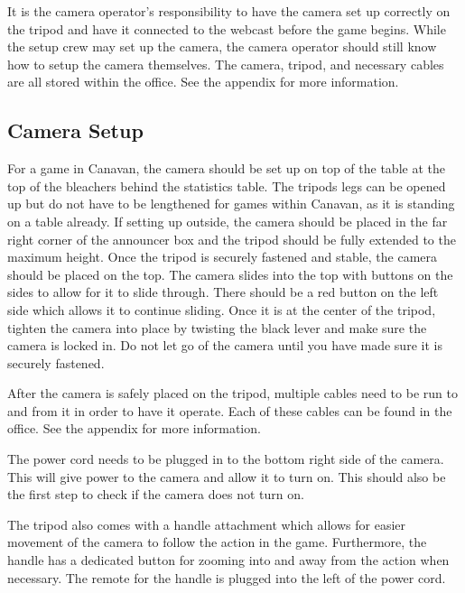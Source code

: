 \documentclass{article}
\begin{document}
It is the camera operator’s responsibility to have the camera set up correctly on the tripod and have it connected to the webcast before the game begins. While the setup crew may set up the camera, the camera operator should still know how to setup the camera themselves. The camera, tripod, and necessary cables are all stored within the office. See the appendix for more information. 


\subsection{Camera Setup}
For a game in Canavan, the camera should be set up on top of the table at the top of the bleachers behind the statistics table. The tripods legs can be opened up but do not have to be lengthened for games within Canavan, as it is standing on a table already. If setting up outside, the camera should be placed in the far right corner of the announcer box and the tripod should be fully extended to the maximum height. Once the tripod is securely fastened and stable, the camera should be placed on the top. The camera slides into the top with buttons on the sides to allow for it to slide through. There should be a red button on the left side which allows it to continue sliding. Once it is at the center of the tripod, tighten the camera into place by twisting the black lever and make sure the camera is locked in. Do not let go of the camera until you have made sure it is securely fastened. 


After the camera is safely placed on the tripod, multiple cables need to be run to and from it in order to have it operate. Each of these cables can be found in the office. See the appendix for more information.


The power cord needs to be plugged in to the bottom right side of the camera. This will give power to the camera and allow it to turn on. This should also be the first step to check if the camera does not turn on. 


The tripod also comes with a handle attachment which allows for easier movement of the camera to follow the action in the game. Furthermore, the handle has a dedicated button for zooming into and away from the action when necessary. The remote for the handle is plugged into the left of the power cord. 
\end{document}
